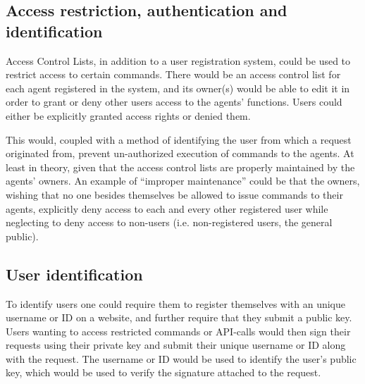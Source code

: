 
\subsection{Access restriction, authentication and identification}
Access Control Lists, in addition to a user registration system, could be used to restrict access to certain commands.
There would be an access control list for each agent registered in the system, and its owner(s) would be able to edit it in order to grant or deny other users access to the agents' functions.
Users could either be explicitly granted access rights or denied them.

This would, coupled with a method of identifying the user from which a request originated from, prevent un-authorized execution of commands to the agents.
At least in theory, given that the access control lists are properly maintained by the agents' owners.
An example of ``improper maintenance'' could be that the owners, wishing that no one besides themselves be allowed to issue commands to their agents, explicitly deny access to each and every other registered user while neglecting to deny access to non-users (i.e. non-registered users, the general public).


\subsection{User identification}
To identify users one could require them to register themselves with an unique username or ID on a website, and further require that they submit a public key.
Users wanting to access restricted commands or API-calls would then sign their requests using their private key and submit their unique username or ID along with the request.
The username or ID would be used to identify the user's public key, which would be used to verify the signature attached to the request.




